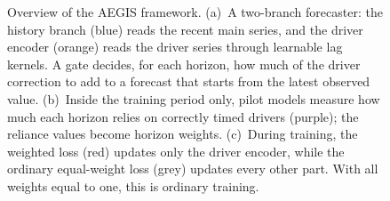 \documentclass[conference]{IEEEtran}
\newcommand{\fw}{AEGIS}
\begin{document}
%
%
%
\begin{figure}[htbp]
\centerline{}
\caption{Overview of the \fw{} framework. (a)~A two-branch forecaster: the history branch (blue) reads the recent main series, and the driver encoder (orange) reads the driver series through learnable lag kernels. A gate decides, for each horizon, how much of the driver correction to add to a forecast that starts from the latest observed value. (b)~Inside the training period only, pilot models measure how much each horizon relies on correctly timed drivers (purple); the reliance values become horizon weights. (c)~During training, the weighted loss (red) updates only the driver encoder, while the ordinary equal-weight loss (grey) updates every other part. With all weights equal to one, this is ordinary training.}
\label{fig:framework}
\end{figure}
\end{document}

